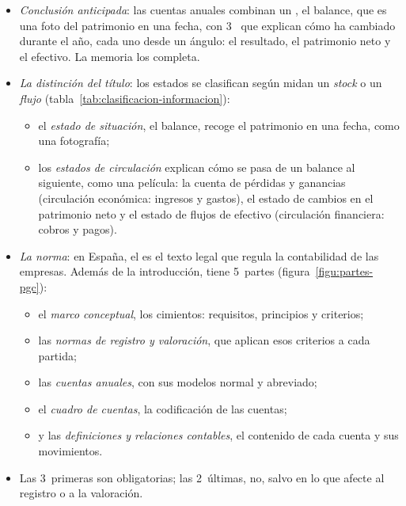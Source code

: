 \documentclass[11pt]{article}
\begin{document}
\begin{itemize}
\item \emph{Conclusión anticipada}: las cuentas anuales combinan un , el balance, que es una foto del patrimonio en una fecha, con 3~ que explican cómo ha cambiado durante el año, cada uno desde un ángulo: el resultado, el patrimonio neto y el efectivo. La memoria los completa.
\item \emph{La distinción del título}: los estados se clasifican según midan un \emph{stock} o un \emph{flujo} (tabla~\ref{tab:clasificacion-informacion}):
  \begin{itemize}
  \item el \emph{estado de situación}, el balance, recoge el patrimonio en una fecha, como una fotografía;
  \item los \emph{estados de circulación} explican cómo se pasa de un balance al siguiente, como una película: la cuenta de pérdidas y ganancias (circulación económica: ingresos y gastos), el estado de cambios en el patrimonio neto y el estado de flujos de efectivo (circulación financiera: cobros y pagos).
  \end{itemize}
\item \emph{La norma}: en España, el  es el texto legal que regula la contabilidad de las empresas\nocite{BOE2007PGC}. Además de la introducción, tiene 5~partes (figura~\ref{figu:partes-pgc}):
  \begin{itemize}
  \item el \emph{marco conceptual}, los cimientos: requisitos, principios y criterios;
  \item las \emph{normas de registro y valoración}, que aplican esos criterios a cada partida;
  \item las \emph{cuentas anuales}, con sus modelos normal y abreviado;
  \item el \emph{cuadro de cuentas}, la codificación de las cuentas;
  \item y las \emph{definiciones y relaciones contables}, el contenido de cada cuenta y sus movimientos.
  \end{itemize}
\item Las 3~primeras son obligatorias; las 2~últimas, no, salvo en lo que afecte al registro o a la valoración.
\end{itemize}
\end{document}
